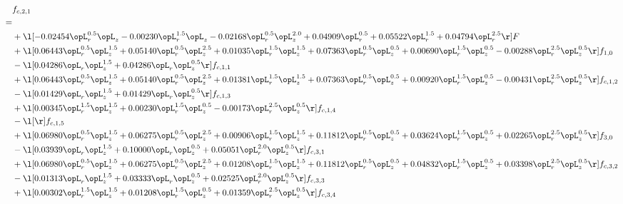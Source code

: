 \begin{alignat}{2} 
\label{eq:f_21_1} 
& f_{c,2,1} \nonumber \\ 
 = \\ 
& + \l[  -0.02454 \opL_r^{0.5} \opL_z   -0.00230 \opL_r^{1.5} \opL_z   -0.02168 \opL_r^{0.5} \opL_z^{2.0} +  0.04909 \opL_r^{0.5} +  0.05522 \opL_r^{1.5} +  0.04794 \opL_r^{2.5}  \r] F \nonumber \\ 
& + \l[  0.06443 \opL_r^{0.5} \opL_z^{1.5} +  0.05140 \opL_r^{0.5} \opL_z^{2.5} +  0.01035 \opL_r^{1.5} \opL_z^{1.5} +  0.07363 \opL_r^{0.5} \opL_z^{0.5} +  0.00690 \opL_r^{1.5} \opL_z^{0.5}   -0.00288 \opL_r^{2.5} \opL_z^{0.5}  \r] f_{1,0} \nonumber \\ 
& - \l[  0.04286 \opL_r \opL_z^{1.5} +  0.04286 \opL_r \opL_z^{0.5}  \r] f_{c,1,1} \nonumber \\ 
& + \l[  0.06443 \opL_r^{0.5} \opL_z^{1.5} +  0.05140 \opL_r^{0.5} \opL_z^{2.5} +  0.01381 \opL_r^{1.5} \opL_z^{1.5} +  0.07363 \opL_r^{0.5} \opL_z^{0.5} +  0.00920 \opL_r^{1.5} \opL_z^{0.5}   -0.00431 \opL_r^{2.5} \opL_z^{0.5}  \r] f_{c,1,2} \nonumber \\ 
& - \l[  0.01429 \opL_r \opL_z^{1.5} +  0.01429 \opL_r \opL_z^{0.5}  \r] f_{c,1,3} \nonumber \\ 
& + \l[  0.00345 \opL_r^{1.5} \opL_z^{1.5} +  0.00230 \opL_r^{1.5} \opL_z^{0.5}   -0.00173 \opL_r^{2.5} \opL_z^{0.5}  \r] f_{c,1,4} \nonumber \\ 
& - \l[  \r] f_{c,1,5} \nonumber \\ 
& + \l[  0.06980 \opL_r^{0.5} \opL_z^{1.5} +  0.06275 \opL_r^{0.5} \opL_z^{2.5} +  0.00906 \opL_r^{1.5} \opL_z^{1.5} +  0.11812 \opL_r^{0.5} \opL_z^{0.5} +  0.03624 \opL_r^{1.5} \opL_z^{0.5} +  0.02265 \opL_r^{2.5} \opL_z^{0.5}  \r] f_{3,0} \nonumber \\ 
& - \l[  0.03939 \opL_r \opL_z^{1.5} +  0.10000 \opL_r \opL_z^{0.5} +  0.05051 \opL_r^{2.0} \opL_z^{0.5}  \r] f_{c,3,1} \nonumber \\ 
& + \l[  0.06980 \opL_r^{0.5} \opL_z^{1.5} +  0.06275 \opL_r^{0.5} \opL_z^{2.5} +  0.01208 \opL_r^{1.5} \opL_z^{1.5} +  0.11812 \opL_r^{0.5} \opL_z^{0.5} +  0.04832 \opL_r^{1.5} \opL_z^{0.5} +  0.03398 \opL_r^{2.5} \opL_z^{0.5}  \r] f_{c,3,2} \nonumber \\ 
& - \l[  0.01313 \opL_r \opL_z^{1.5} +  0.03333 \opL_r \opL_z^{0.5} +  0.02525 \opL_r^{2.0} \opL_z^{0.5}  \r] f_{c,3,3} \nonumber \\ 
& + \l[  0.00302 \opL_r^{1.5} \opL_z^{1.5} +  0.01208 \opL_r^{1.5} \opL_z^{0.5} +  0.01359 \opL_r^{2.5} \opL_z^{0.5}  \r] f_{c,3,4} \nonumber \\ 

\end{alignat}
